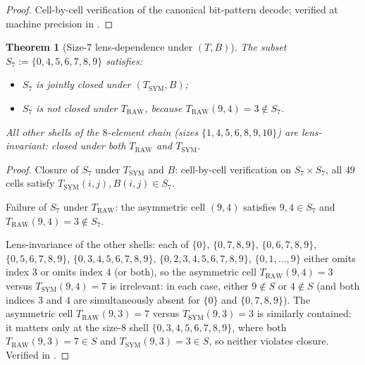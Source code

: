 \documentclass[11pt,reqno]{amsart}
\newtheorem{theorem}{Theorem}[section]
\theoremstyle{definition}
\newcommand{\TRAW}{T_{\mathrm{RAW}}}
\newcommand{\TSYM}{T_{\mathrm{SYM}}}
\begin{document}
\begin{proof}
Cell-by-cell verification of the canonical bit-pattern decode;
verified at machine precision in \cite{Gen13Foundations}.
\end{proof}

\begin{theorem}[Size-$7$ lens-dependence under $(T,B)$]
\label{thm:size7-lens}
The subset $S_7 := \{0,4,5,6,7,8,9\}$ satisfies:
\begin{itemize}[leftmargin=*]
\item $S_7$ is jointly closed under $(\TSYM, B)$;
\item $S_7$ is \emph{not} closed under $\TRAW$, because
  $\TRAW(9,4) = 3 \notin S_7$.
\end{itemize}
All other shells of the $8$-element chain (sizes
$\{1,4,5,6,8,9,10\}$) are lens-invariant: closed under both
$\TRAW$ and $\TSYM$.
\end{theorem}

\begin{proof}
Closure of $S_7$ under $\TSYM$ and $B$: cell-by-cell verification
on $S_7\times S_7$, all $49$ cells satisfy
$\TSYM(i,j),B(i,j)\in S_7$.

Failure of $S_7$ under $\TRAW$: the asymmetric cell $(9,4)$
satisfies $9,4\in S_7$ and $\TRAW(9,4)=3\notin S_7$.

Lens-invariance of the other shells: each of $\{0\}$,
$\{0,7,8,9\}$, $\{0,6,7,8,9\}$, $\{0,5,6,7,8,9\}$,
$\{0,3,4,5,6,7,8,9\}$, $\{0,2,3,4,5,6,7,8,9\}$,
$\{0,1,\dots,9\}$ either omits index $3$ or omits index $4$
(or both), so the asymmetric cell $\TRAW(9,4) = 3$ versus
$\TSYM(9,4)=7$ is irrelevant: in each case, either $9\notin S$ or
$4\notin S$ (and both indices $3$ and $4$ are simultaneously
absent for $\{0\}$ and $\{0,7,8,9\}$). The asymmetric cell
$\TRAW(9,3)=7$ versus $\TSYM(9,3)=3$ is similarly contained: it
matters only at the size-$8$ shell $\{0,3,4,5,6,7,8,9\}$, where
both $\TRAW(9,3)=7\in S$ and $\TSYM(9,3)=3\in S$, so neither
violates closure. Verified in \cite{Gen13WP115}.
\end{proof}
\end{document}
